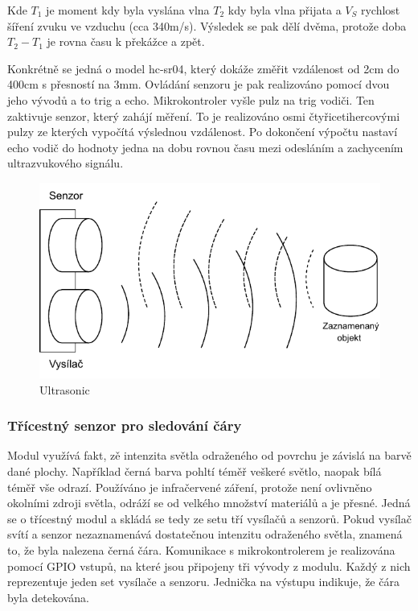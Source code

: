 Kde $T_1$ je moment kdy byla vyslána vlna $T_2$ kdy byla vlna přijata a $V_S$ rychlost šíření zvuku ve vzduchu (cca 340m/s). Výsledek se pak dělí dvěma, protože doba $T_2 - T_1$ je rovna času k překážce a zpět.

Konkrétně se jedná o model hc-sr04, který dokáže změřit vzdálenost od 2cm do 400cm s přesností na 3mm. Ovládání senzoru je pak realizováno pomocí dvou jeho vývodů a to trig a echo. Mikrokontroler vyšle pulz na trig vodiči. Ten zaktivuje senzor, který zahájí měření. To je realizováno osmi čtyřicetihercovými pulzy ze kterých vypočítá výslednou vzdálenost. Po dokončení výpočtu nastaví echo vodič do hodnoty jedna na dobu rovnou času mezi odesláním a zachycením ultrazvukového signálu. \cite{embeded_robotics}

\begin{figure}[h!]
	\centering
	\includegraphics[scale=0.75]{obrazky-figures/ultrasonic.pdf}
	\caption{Ultrasonic}
	\label{}
\end{figure}

\subsubsection*{Třícestný senzor pro sledování čáry}
Modul využívá fakt, zě intenzita světla odraženého od povrchu je závislá na barvě dané plochy. Například černá barva pohltí téměř veškeré světlo, naopak bílá téměř vše odrazí. Používáno je infračervené záření, protože není ovlivněno okolními zdroji světla, odráží se od velkého množství materiálů a je přesné. Jedná se o třícestný modul a skládá se tedy ze setu tří vysílačů a senzorů. Pokud vysílač svítí a senzor nezaznamenává dostatečnou intenzitu odraženého světla, znamená to, že byla nalezena černá čára.
Komunikace s mikrokontrolerem je realizována pomocí GPIO vstupů, na které jsou připojeny tři vývody z modulu. Každý z nich reprezentuje jeden set vysílače a senzoru. Jednička na výstupu indikuje, že čára byla detekována.

